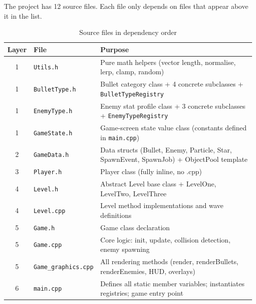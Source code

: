 \documentclass[11pt]{article}
\begin{document}
The project has 12 source files. Each file only depends on files that appear
above it in the list.

\begin{table}[htbp]
    \centering
    \caption{Source files in dependency order}
    \label{tab:files}
    \renewcommand{\arraystretch}{1.3}
    \begin{tabular}{|c|l|p{7.5cm}|}
        \hline
        \textbf{Layer} & \textbf{File} & \textbf{Purpose} \\
        \hline
        1 & \texttt{Utils.h}           & Pure math helpers (vector length, normalise, lerp, clamp, random) \\
        \hline
        1 & \texttt{BulletType.h}      &  Bullet category class + 4 concrete subclasses + \texttt{BulletTypeRegistry}\\
        \hline
        1 & \texttt{EnemyType.h}       & Enemy stat profile class + 3 concrete subclasses + \texttt{EnemyTypeRegistry} \\
        \hline
        1 & \texttt{GameState.h}       & Game-screen state value class (constants defined in \texttt{main.cpp}) \\
        \hline
        2 & \texttt{GameData.h}        & Data structs (Bullet, Enemy, Particle, Star, SpawnEvent, SpawnJob) + ObjectPool template \\
        \hline
        3 & \texttt{Player.h}          & Player class (fully inline, no .cpp) \\
        \hline
        4 & \texttt{Level.h}           & Abstract Level base class + LevelOne, LevelTwo, LevelThree \\
        \hline
        4 & \texttt{Level.cpp}         & Level method implementations and wave definitions \\
        \hline
        5 & \texttt{Game.h}            & Game class declaration \\
        \hline
        5 & \texttt{Game.cpp}          & Core logic: init, update, collision detection, enemy spawning \\
        \hline
        5 & \texttt{Game\_graphics.cpp}& All rendering methods (render, renderBullets, renderEnemies, HUD, overlays) \\
        \hline
        6 & \texttt{main.cpp}          & Defines all static member variables; instantiates registries; game entry point \\
        \hline
    \end{tabular}
\end{table}
\end{document}
